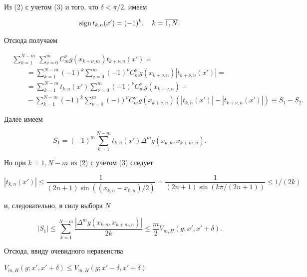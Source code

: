 \begin{pf}
Из (2) с учетом (3) и того, что $\delta<\pi/2$, имеем


$$


\sign t_{k,n}(x')=(-1)^k,\quad


k=\overline{1,N}.


$$


Отсюда получаем


\begin{align*}


&\sum^{N-m}_{k=1}\,\sum^m_{\nu=0}C^\nu_mg(x_{k+\nu,m})t_{k+\nu,n}(x')=\\


&\qquad=\sum^{N-m}_{k=1}(-1)^k\sum^m_{\nu=0}(-1)^\nu C^\nu_mg


(x_{k+\nu,n})|t_{k+\nu,n}(x')|=\\


&\qquad=\sum^{N-m}_{k=1}t_{k,n}(x')\sum^m_{\nu=0}(-1)^\nu


C^\nu_mg(x_{k+\nu,n})-\\


&\qquad-\sum^{N-m}_{k=1}(-1)^k\sum^m_{\nu=0}(-1)^\nu


C^\nu_mg(x_{k+\nu,n})(|t_{k,n}(x')|-|t_{k+\nu,n}(x')|)\equiv S_1-S_2.


\end{align*}


Далее имеем


$$


S_1=(-1)^m\sum^{N-m}_{k=1}t_{k,n}(x')\Delta^mg(x_{k,n},


x_{k+m,n}).


$$


Но при $k=\overline{1,N-m}$ из (2) с учетом (3) следует


$$


|t_{k,n}(x')|\le


\frac{1}


{(2n+1)\sin((x_{k,n}-x_{0,n})/2)}=


\frac{1}{(2n+1)\sin(k\pi/(2n+1))}\le 1/(2k)


$$


и, следовательно, в силу выбора $N$


$$


|S_1|\le\sum^{N-m}_{k=1}


\frac{|\Delta^mg(x_{k,n},x_{k+m,n})|}{2k}\le \frac{m}{2}


V_{m,H}(g;x',x'+\delta).


$$


Отсюда, ввиду очевидного неравенства


$V_{m,H}(g;x',x'+\delta)\le V_{m,H}(g;x'-\delta,x'+\delta)$



\end{pf}
